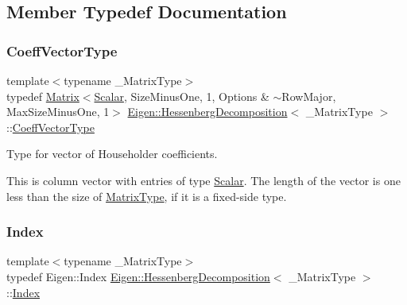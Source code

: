 \subsection{Member Typedef Documentation}
\mbox{\label{class_eigen_1_1_hessenberg_decomposition_a567f99f3770365777b67bf9832b6fac1}} 
\subsubsection{\texorpdfstring{CoeffVectorType}{CoeffVectorType}}
{\footnotesize\ttfamily template$<$typename \+\_\+\+Matrix\+Type$>$ \\
typedef \mbox{\hyperlink{class_eigen_1_1_matrix}{Matrix}}$<$\mbox{\hyperlink{class_eigen_1_1_hessenberg_decomposition_a9420c36226cae7d92da8308a3f97ac2f}{Scalar}}, Size\+Minus\+One, 1, Options \& $\sim$Row\+Major, Max\+Size\+Minus\+One, 1$>$ \mbox{\hyperlink{class_eigen_1_1_hessenberg_decomposition}{Eigen\+::\+Hessenberg\+Decomposition}}$<$ \+\_\+\+Matrix\+Type $>$\+::\mbox{\hyperlink{class_eigen_1_1_hessenberg_decomposition_a567f99f3770365777b67bf9832b6fac1}{Coeff\+Vector\+Type}}}



Type for vector of Householder coefficients. 

This is column vector with entries of type \mbox{\hyperlink{class_eigen_1_1_hessenberg_decomposition_a9420c36226cae7d92da8308a3f97ac2f}{Scalar}}. The length of the vector is one less than the size of \mbox{\hyperlink{class_eigen_1_1_hessenberg_decomposition_a93a611350a7db9d1da18f2c828ecea9f}{Matrix\+Type}}, if it is a fixed-\/side type. \mbox{\label{class_eigen_1_1_hessenberg_decomposition_a8e287ac222f53e2c8ce82faa43e95ac6}} 
\subsubsection{\texorpdfstring{Index}{Index}}
{\footnotesize\ttfamily template$<$typename \+\_\+\+Matrix\+Type$>$ \\
typedef Eigen\+::\+Index \mbox{\hyperlink{class_eigen_1_1_hessenberg_decomposition}{Eigen\+::\+Hessenberg\+Decomposition}}$<$ \+\_\+\+Matrix\+Type $>$\+::\mbox{\hyperlink{class_eigen_1_1_hessenberg_decomposition_a8e287ac222f53e2c8ce82faa43e95ac6}{Index}}}

